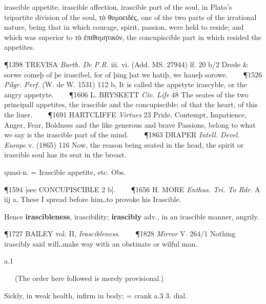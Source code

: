 \begin{description}[wide, labelwidth=!, labelindent=0pt]
\begin{myenumerate}
 irascible appetite, irascible affection, irascible part of the soul, in Plato's tripartite division of the soul, τὸ θυµοειδές, one of the two parts of the irrational nature, being that in which courage, spirit, passion, were held to reside; and which was superior to τὸ ἐπιθυµητικόν, the concupiscible part in which resided the appetites.

\P 1398 TREVISA  \textit{Barth. De P.R.} iii. vi. (Add. MS. 27944) lf. 20 b/2 Drede \& sorwe comeþ of þe irascibel, for of þing þat we hatiþ, we haueþ sorowe.    
\P 1526  \textit{Pilgr. Perf.} (W. de W. 1531) 112 b, It is called the appetyte irascyble, or the angry appetyte.    
\P 1606 L. BRYSKETT  \textit{Civ. Life} 48 The seates of the two principall appetites, the irascible and the concupiscible; of that the heart, of this the liuer.    
\P 1691 HARTCLIFFE  \textit{Virtues} 23 Pride, Contempt, Impatience, Anger, Fear, Boldness and the like generous and brave Passions, belong to what we say is the irascible part of the mind.    
\P 1863 DRAPER  \textit{Intell. Devel. Europe} v. (1865) 116 Now, the reason being seated in the head, the spirit or irascible soul has its seat in the breast.

 quasi-n. = Irascible appetite, etc. Obs.

\P 1594 [see  CONCUPISCIBLE 2 b].    
\P 1656 H. MORE  \textit{Enthus. Tri. To Rdr.} A iij a, These I spread before him‥to provoke his Irascible.

\noindent Hence \textbf{irascibleness}, irascibility; \textbf{irascibly} adv., in an irascible manner, angrily.

\P 1727 BAILEY  vol. II, \textit{Irascibleness}.    
\P 1828 \textit{Mirror}  V. 264/1 Nothing irascibly said will‥make way with an obstinate or wilful man.
\end{myenumerate}


 a.1

\noindent {}


   (The order here followed is merely provisional.)
\vspace{-0.3cm}

\begin{myenumerate}
 Sickly, in weak health, infirm in body; = crank a.3 3. dial.


\end{myenumerate}
\end{description}
